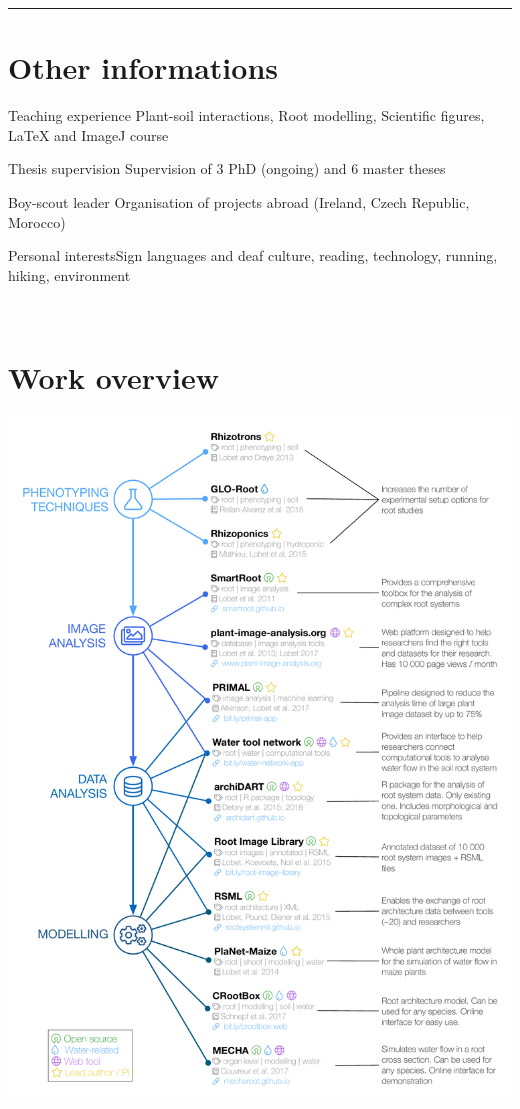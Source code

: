 \documentclass[]{friggeri-cv} %
\begin{document}

\rule{\linewidth}{0.5pt}

\section{Other informations}

\descr 
{Teaching experience}
{}
{Plant-soil interactions, Root modelling, Scientific figures, LaTeX and ImageJ course}

\descr 
{Thesis supervision}
{}
{Supervision of 3 PhD (ongoing) and 6 master theses}


\descr
{Boy-scout leader}{}
{Organisation of projects abroad (Ireland, Czech Republic, Morocco)}

\descr
{Personal interests}{}{Sign languages and deaf culture, reading, technology, running, hiking, environment}



\newpage
~
\vspace{0.05cm}
\section{Work overview}
\hspace*{-0.3\linewidth}
\includegraphics[width=1.3\linewidth]{work_overview}
\end{document}
